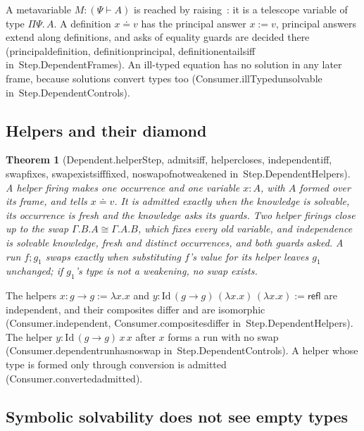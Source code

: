 \documentclass[11pt]{article}
\newtheorem{theorem}{Theorem}
\theoremstyle{remark}
\newcommand{\lean}[1]{{\ttfamily\def\_{\textunderscore\allowbreak}#1}}
\newcommand{\inmod}[1]{in~{\ttfamily\def\_{\textunderscore\allowbreak}#1}}
\begin{document}
A metavariable $M : (\Psi \vdash A)$ is reached by raising~\cite{miller92}: it is a telescope variable of type
$\Pi\Psi.\,A$. A definition $x \doteq v$ has the principal answer $x := v$, principal answers extend along
definitions, and asks of equality guards are decided there (\lean{principal\_definition},
\lean{definition\_principal}, \lean{definition\_entails\_iff} \inmod{Step.DependentFrames}). An ill-typed equation has no solution in any
later frame, because solutions convert types too (\lean{Consumer.illTyped\_unsolvable} \inmod{Step.DependentControls}).

\subsection{Helpers and their diamond}

\begin{theorem}[\lean{Dependent.helperStep}, \lean{admits\_iff}, \lean{helper\_closes}, \lean{independent\_iff}, \lean{swap\_fixes}, \lean{swap\_exists\_iff\_fixed}, \lean{no\_swap\_of\_not\_weakened} \inmod{Step.DependentHelpers}]
A helper firing makes one occurrence and one variable $x : A$, with $A$ formed over its frame, and tells
$x \doteq v$. It is admitted exactly when the knowledge is solvable, its occurrence is fresh and the
knowledge asks its guards. Two helper firings close up to the swap $\Gamma.B.A \cong \Gamma.A.B$, which
fixes every old variable, and independence is solvable knowledge, fresh and distinct occurrences, and
both guards asked. A run $f;g_1$ swaps exactly when substituting $f$'s value for its helper leaves $g_1$
unchanged; if $g_1$'s type is not a weakening, no swap exists.
\end{theorem}

The helpers $x : g\to g := \lambda x.x$ and $y : \mathrm{Id}\,(g\to g)\,(\lambda x.x)\,(\lambda x.x) :=
\mathsf{refl}$ are independent, and their composites differ and are isomorphic
(\lean{Consumer.independent}, \lean{Consumer.composites\_differ} \inmod{Step.DependentHelpers}). The helper
$y : \mathrm{Id}\,(g\to g)\,x\,x$ after $x$ forms a run with no swap (\lean{Consumer.dependent\_run\_has\_no\_swap}
\inmod{Step.DependentControls}). A helper whose type is formed only through conversion is admitted
(\lean{Consumer.converted\_admitted}).

\subsection{Symbolic solvability does not see empty types}
\end{document}
